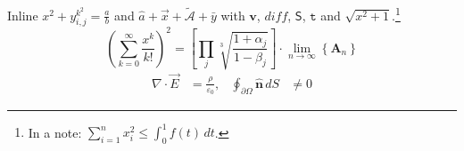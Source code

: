 \documentclass[12pt]{article}
\begin{document}
Inline $x^2+y_{i,j}^{k^2} = \frac{a}{b}$ and $\hat{a} + \vec{x} + \tilde{\mathcal{A}} + \bar{y}$ with $\mathbf{v}$, $\mathit{diff}$, $\mathsf{S}$, $\mathtt{t}$ and $\sqrt{x^2+1}$.\footnote{In a note: $\sum_{i=1}^n x_i^2 \le \int_0^1 f(t)\,dt$.}
\begin{equation}
  \left( \sum_{k=0}^{\infty} \frac{x^k}{k!} \right)^{\!2} = \left[ \prod_{j} \sqrt[3]{\frac{1+\alpha_j}{1-\beta_j}} \right] \cdot \lim_{n\to\infty} \left\{ \mathbf{A}_n \right\}
\end{equation}
\begin{align}
  \nabla \cdot \vec{E} &= \frac{\rho}{\varepsilon_0}, & \oint_{\partial\Omega} \hat{\mathbf{n}} \, dS &\ne 0
\end{align}
\end{document}
